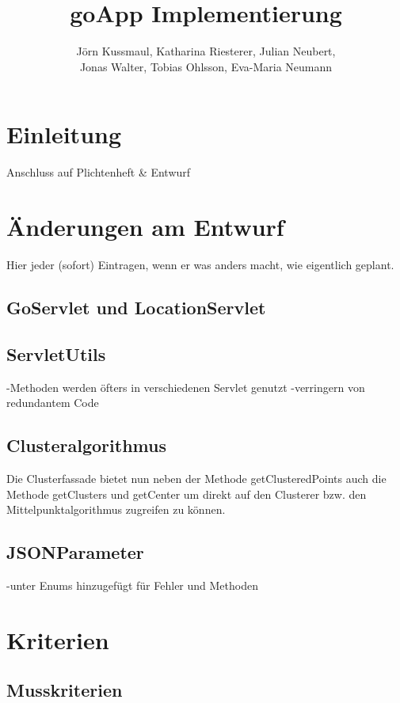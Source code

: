 \documentclass{scrartcl}
\title{goApp Implementierung}
\author{Jörn Kussmaul, Katharina Riesterer, Julian Neubert,\\ Jonas Walter, Tobias Ohlsson, Eva-Maria Neumann}
\begin{document}
	\maketitle
	\newpage
	\tableofcontents
	\newpage

	\section{Einleitung}
	Anschluss auf Plichtenheft \& Entwurf
	
	\newpage
	\section{Änderungen am Entwurf}
	Hier jeder (sofort) Eintragen, wenn er was anders macht, wie eigentlich geplant.
	
	
	\subsection{GoServlet und LocationServlet}
	
	\subsection{ServletUtils}
	-Methoden werden öfters in verschiedenen Servlet genutzt
	-verringern von redundantem Code
	
	\subsection{Clusteralgorithmus}
	Die Clusterfassade bietet nun neben der Methode getClusteredPoints auch die Methode getClusters und getCenter um direkt auf den Clusterer bzw. den Mittelpunktalgorithmus zugreifen zu können. 
	
	\subsection{JSONParameter}
	-unter Enums hinzugefügt für Fehler und Methoden
	\newpage
	\section{Kriterien}
	\subsection{Musskriterien}
\end{document}
